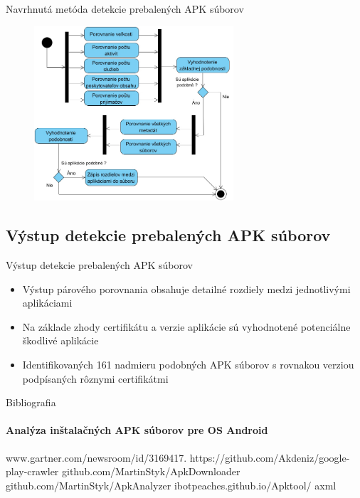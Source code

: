 \documentclass{beamer}
\begin{document}
  \begin{frame}[label=lists]{Navrhnutá metóda detekcie prebalených APK súborov}
	\begin{figure}[htb]
  \begin{center}
    \includegraphics[height=6.5cm]{images/diagram.jpg}
  \end{center}
\end{figure}
  \end{frame} 

   \subsection{Výstup detekcie prebalených APK súborov}
  \begin{frame}[label=lists]{Výstup detekcie prebalených APK súborov}
	\begin{itemize}
	\item Výstup párového porovnania obsahuje detailné rozdiely medzi jednotlivými aplikáciami
	\item Na základe zhody certifikátu a verzie aplikácie sú vyhodnotené potenciálne škodlivé aplikácie
	\item Identifikovaných 161 nadmieru podobných APK súborov s rovnakou verziou podpísaných rôznymi certifikátmi
	\end{itemize}
	\end{frame}


  \begin{frame}[label=bibliography]{Bibliografia}
    \framesubtitle{Analýza inštalačných APK súborov pre OS Android}
    \begin{thebibliography}{9}
         www.gartner.com/newsroom/id/3169417.
          https://github.com/Akdeniz/google-play-crawler
          github.com/MartinStyk/ApkDownloader
          github.com/MartinStyk/ApkAnalyzer
          ibotpeaches.github.io/Apktool/
          axml
    
    \end{thebibliography}
  \end{frame}
\end{document}
